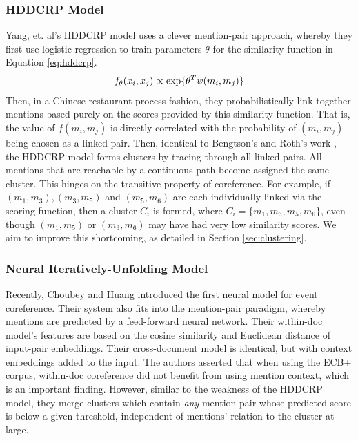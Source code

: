 \documentclass[11pt,a4paper]{article}
\begin{document}
\subsubsection{HDDCRP Model}
\label{sec:HDDCRP}
Yang, et. al's HDDCRP model  uses a clever mention-pair approach, whereby they first use logistic regression to train parameters $\theta$ for the similarity function in Equation \ref{eq:hddcrp}.  
\begin{equation}
\label{eq:hddcrp}
f_{\theta}(x_i,x_j) \propto \textnormal{exp\{} \theta^T\psi(m_i,m_j)\textnormal{\}}
\end{equation}
Then, in a Chinese-restaurant-process fashion, they probabilistically link together mentions based purely on the scores provided by this similarity function.  That is, the value of $f(m_i,m_j)$ is directly correlated with the probability of $(m_i,m_j)$ being chosen as a linked pair.  Then, identical to Bengtson's and Roth's work \cite{Bengtson:2008:UVF:1613715.1613756}, the HDDCRP model forms clusters by tracing through all linked pairs. All mentions that are reachable by a continuous path become assigned the same cluster.  This hinges on the transitive property of coreference.  For example, if ${(m_1,m_3),(m_3,m_5)}$ and $(m_5,m_6)$ are each individually linked via the scoring function, then a cluster $C_i$ is formed, where $C_i = \{m_1,m_3,m_5,m_6\}$, even though $(m_1,m_5)$ or $(m_3,m_6)$ may have had very low similarity scores. We aim to improve this shortcoming, as detailed in Section \ref{sec:clustering}.

\subsubsection{Neural Iteratively-Unfolding Model}
\label{sec:Choubey}
Recently, Choubey and Huang  introduced the first neural model for event coreference.  Their system also fits into the mention-pair paradigm, whereby mentions are predicted by a feed-forward neural network. Their within-doc model's features are based on the cosine similarity and Euclidean distance of input-pair embeddings.  Their cross-document model is identical, but with context embeddings added to the input.  The authors asserted that when using the ECB+ corpus, within-doc coreference did not benefit from using mention context, which is an important finding.  However, similar to the weakness of the HDDCRP model, they merge clusters which contain \textit{any} mention-pair whose predicted score is below a given threshold, independent of mentions' relation to the cluster at large.
\end{document}
